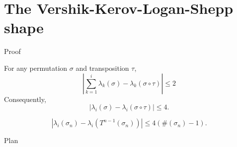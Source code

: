 \documentclass[english,xcolor=table]{beamer}
\begin{document}
\section{The Vershik-Kerov-Logan-Shepp shape}
\begin{frame}{Proof}
\begin{lemma} \label{lemma2}
For any permutation $\sigma$ and transposition  $\tau$,\begin{equation*} \label{sum}
\left|\sum_{k=1}^i \lambda_k(\sigma)-{\lambda}_k\left(\sigma\circ\tau\right)\right| \leq 2
\end{equation*}
Consequently, 
\begin{equation*} \label{sep}
\left|\lambda_i(\sigma)-\lambda_i\left(\sigma\circ\tau\right)\right| \leq 4.
\end{equation*}
\end{lemma}
\begin{corollary}
\begin{equation} \label{sep2}
\left|\lambda_i(\sigma_n)-\lambda_i\left(T^{n-1}(\sigma_n)\right)\right| \leq 4(\#(\sigma_n)-1).
\end{equation}
\end{corollary}
\end{frame}
\begin{frame}{Plan}
\tableofcontents[currentsection,currentsubsection,
    hideothersubsections, 
    sectionstyle=show/shaded,
]
\end{frame}
\end{document}

